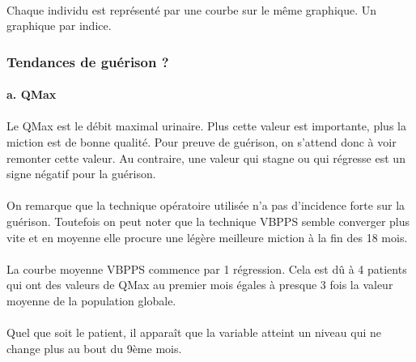 \documentclass[11pt]{article}
\begin{document}
\paragraph{}
Chaque individu est représenté par une courbe sur le même graphique. Un
graphique par indice.

    \subsubsection{Tendances de guérison ?}\label{tendances-de-guuxe9rison}

    \paragraph{a. QMax}\label{a.-qmax}

\paragraph{}
    Le QMax est le débit maximal urinaire. Plus cette valeur est importante,
plus la miction est de bonne qualité. Pour preuve de guérison, on
s'attend donc à voir remonter cette valeur. Au contraire, une valeur qui
stagne ou qui régresse est un signe négatif pour la guérison.



    \begin{center}
    \end{center}
    
    
\paragraph{}
On remarque que la technique opératoire utilisée n'a pas d'incidence
forte sur la guérison. Toutefois on peut noter que la technique VBPPS
semble converger plus vite et en moyenne elle procure une légère
meilleure miction à la fin des 18 mois.
\paragraph{}
La courbe moyenne VBPPS commence par 1 régression. Cela est dû à 4
patients qui ont des valeurs de QMax au premier mois égales à presque 3
fois la valeur moyenne de la population globale.
\paragraph{}
Quel que soit le patient, il apparaît que la variable atteint un niveau
qui ne change plus au bout du 9ème mois.
\end{document}
